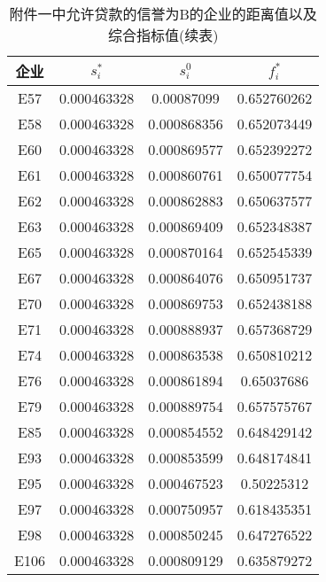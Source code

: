 \documentclass{cumcmthesis}
\begin{document}
\begin{appendices}
\begin{table}[H]
\begin{tabular}{cccc}
		\bottomrule[1.5pt]
\end{tabular}
\end{table}

\begin{table}[H]   %
	\caption{附件一中允许贷款的信誉为B的企业的距离值以及综合指标值(续表)}\label{tab:014} \centering
	\begin{tabular}{cccc}
		\toprule[1.5pt]
		企业 & $s_i^*$    & $s_i^0$        & $f_i^*$         \\
		\midrule[1pt]
E57 & 0.000463328 & 0.00087099 & 0.652760262 \\ 
E58 & 0.000463328 & 0.000868356 & 0.652073449 \\ 
E60 & 0.000463328 & 0.000869577 & 0.652392272 \\ 
E61 & 0.000463328 & 0.000860761 & 0.650077754 \\ 
E62 & 0.000463328 & 0.000862883 & 0.650637577 \\ 
E63 & 0.000463328 & 0.000869409 & 0.652348387 \\ 
E65 & 0.000463328 & 0.000870164 & 0.652545339 \\ 
E67 & 0.000463328 & 0.000864076 & 0.650951737 \\ 
E70 & 0.000463328 & 0.000869753 & 0.652438188 \\ 
E71 & 0.000463328 & 0.000888937 & 0.657368729 \\ 
E74 & 0.000463328 & 0.000863538 & 0.650810212 \\ 
E76 & 0.000463328 & 0.000861894 & 0.65037686 \\ 
E79 & 0.000463328 & 0.000889754 & 0.657575767 \\ 
E85 & 0.000463328 & 0.000854552 & 0.648429142 \\ 
E93 & 0.000463328 & 0.000853599 & 0.648174841 \\ 
E95 & 0.000463328 & 0.000467523 & 0.50225312 \\ 
E97 & 0.000463328 & 0.000750957 & 0.618435351 \\ 
E98 & 0.000463328 & 0.000850245 & 0.647276522 \\ 
E106 & 0.000463328 & 0.000809129 & 0.635879272 \\ 
		\bottomrule[1.5pt]
\end{tabular}
\end{table}


\end{appendices}
\end{document}
